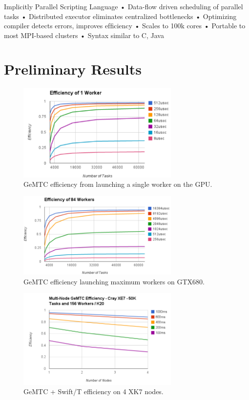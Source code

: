 \documentclass[conference]{IEEEtran}
\begin{document}
Implicitly Parallel Scripting Language • Data-ﬂow driven scheduling of parallel tasks • Distributed executor eliminates centralized bottlenecks • Optimizing compiler detects errors, improves efﬁciency • Scales to 100k cores • Portable to most MPI-based clusters • Syntax similar to C, Java

\section{Preliminary Results}

\begin{figure}[h]
\centering\includegraphics[width=8cm]{imgs/1worker.png}
\caption{GeMTC efficiency from launching a single worker on the GPU.}
\label{fig:1worker}
\end{figure}

\begin{figure}[h]
\centering\includegraphics[width=8cm]{imgs/84workers.png}
\caption{GeMTC efficiency launching maximum workers on GTX680.}
\label{fig:84workers}
\end{figure}

\begin{figure}[h]
\centering\includegraphics[width=8cm]{imgs/multinode.png}
\caption{GeMTC + Swift/T efficiency on 4 XK7 nodes.}
\label{fig:multinode}
\end{figure}
\end{document}
